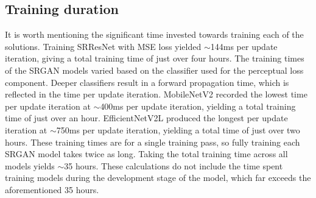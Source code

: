 \subsection{Training duration}
It is worth mentioning the significant time invested towards training each of the solutions. Training SRResNet with MSE loss yielded $\sim$144ms per update iteration, giving a total training time of just over four hours. The training times of the SRGAN models varied based on the classifier used for the perceptual loss component. Deeper classifiers result in a forward propagation time, which is reflected in the time per update iteration. MobileNetV2 recorded the lowest time per update iteration at $\sim$400ms per update iteration, yielding a total training time of just over an hour. EfficientNetV2L produced the longest per update iteration at $\sim$750ms per update iteration, yielding a total time of just over two hours. These training times are for a single training pass, so fully training each SRGAN model takes twice as long. Taking the total training time across all models yields $\sim$35 hours. These calculations do not include the time spent training models during the development stage of the model, which far exceeds the aforementioned 35 hours.

